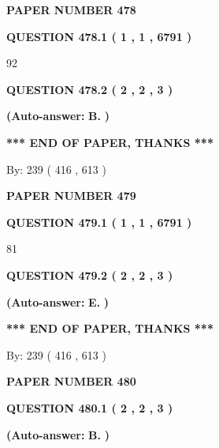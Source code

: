 \documentclass{ctexart}
\begin{document}
   
\newpage 
\setcounter{page}{ 
   478001 } 
   
   
 {\textbf{ \Large{ PAPER NUMBER  478  }}}
   
   
   
   
  
  
{\textbf{\large{QUESTION
478.1 
 ( 1 , 1 , 6791 )
}}}

92
  
  
{\textbf{\large{QUESTION
478.2 
 ( 2 , 2 , 3 )
}}}
 
 
{\textbf{(Auto-answer:}}
{\textbf{\large{
B.}}}
{\textbf{)}}
 
 
   
   
   
   
\vspace{1.0in} 
{\textbf{\large{ *** END OF PAPER, THANKS *** }}} 
   
   
\hspace{1.0in} By: 
 239 ( 416 ,  613 )
   
   
   
   
\newpage 
\setcounter{page}{ 
   479001 } 
   
   
 {\textbf{ \Large{ PAPER NUMBER  479  }}}
   
   
   
   
  
  
{\textbf{\large{QUESTION
479.1 
 ( 1 , 1 , 6791 )
}}}

81
  
  
{\textbf{\large{QUESTION
479.2 
 ( 2 , 2 , 3 )
}}}
 
 
{\textbf{(Auto-answer:}}
{\textbf{\large{
E.}}}
{\textbf{)}}
 
 
   
   
   
   
\vspace{1.0in} 
{\textbf{\large{ *** END OF PAPER, THANKS *** }}} 
   
   
\hspace{1.0in} By: 
 239 ( 416 ,  613 )
   
   
   
   
\newpage 
\setcounter{page}{ 
   480001 } 
   
   
 {\textbf{ \Large{ PAPER NUMBER  480  }}}
   
   
   
   
  
  
{\textbf{\large{QUESTION
480.1 
 ( 2 , 2 , 3 )
}}}
 
 
{\textbf{(Auto-answer:}}
{\textbf{\large{
B.}}}
{\textbf{)}}
 
 
  
\end{document}
